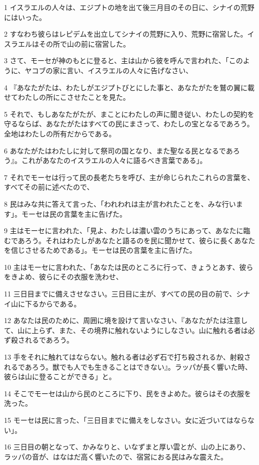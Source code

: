 \par 1 イスラエルの人々は、エジプトの地を出て後三月目のその日に、シナイの荒野にはいった。
\par 2 すなわち彼らはレピデムを出立してシナイの荒野に入り、荒野に宿営した。イスラエルはその所で山の前に宿営した。
\par 3 さて、モーセが神のもとに登ると、主は山から彼を呼んで言われた、「このように、ヤコブの家に言い、イスラエルの人々に告げなさい、
\par 4 『あなたがたは、わたしがエジプトびとにした事と、あなたがたを鷲の翼に載せてわたしの所にこさせたことを見た。
\par 5 それで、もしあなたがたが、まことにわたしの声に聞き従い、わたしの契約を守るならば、あなたがたはすべての民にまさって、わたしの宝となるであろう。全地はわたしの所有だからである。
\par 6 あなたがたはわたしに対して祭司の国となり、また聖なる民となるであろう』。これがあなたのイスラエルの人々に語るべき言葉である」。
\par 7 それでモーセは行って民の長老たちを呼び、主が命じられたこれらの言葉を、すべてその前に述べたので、
\par 8 民はみな共に答えて言った、「われわれは主が言われたことを、みな行います」。モーセは民の言葉を主に告げた。
\par 9 主はモーセに言われた、「見よ、わたしは濃い雲のうちにあって、あなたに臨むであろう。それはわたしがあなたと語るのを民に聞かせて、彼らに長くあなたを信じさせるためである」。モーセは民の言葉を主に告げた。
\par 10 主はモーセに言われた、「あなたは民のところに行って、きょうとあす、彼らをきよめ、彼らにその衣服を洗わせ、
\par 11 三日目までに備えさせなさい。三日目に主が、すべての民の目の前で、シナイ山に下るからである。
\par 12 あなたは民のために、周囲に境を設けて言いなさい、『あなたがたは注意して、山に上らず、また、その境界に触れないようにしなさい。山に触れる者は必ず殺されるであろう。
\par 13 手をそれに触れてはならない。触れる者は必ず石で打ち殺されるか、射殺されるであろう。獣でも人でも生きることはできない』。ラッパが長く響いた時、彼らは山に登ることができる」と。
\par 14 そこでモーセは山から民のところに下り、民をきよめた。彼らはその衣服を洗った。
\par 15 モーセは民に言った、「三日目までに備えをしなさい。女に近づいてはならない」。
\par 16 三日目の朝となって、かみなりと、いなずまと厚い雲とが、山の上にあり、ラッパの音が、はなはだ高く響いたので、宿営におる民はみな震えた。
